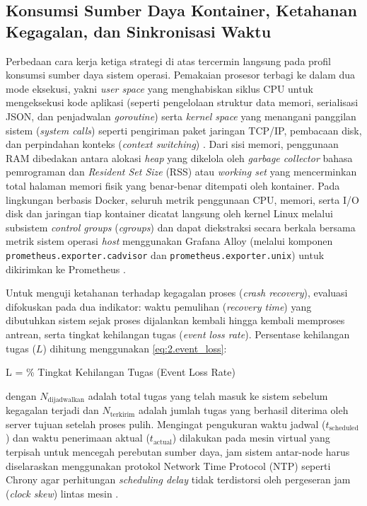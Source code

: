 \subsection{Konsumsi Sumber Daya Kontainer, Ketahanan Kegagalan, dan Sinkronisasi Waktu} \label{II.Teori_Resource}
Perbedaan cara kerja ketiga strategi di atas tercermin langsung pada profil konsumsi sumber daya sistem operasi. Pemakaian prosesor terbagi ke dalam dua mode eksekusi, yakni \textit{user space} yang menghabiskan siklus CPU untuk mengeksekusi kode aplikasi (seperti pengelolaan struktur data memori, serialisasi JSON, dan penjadwalan \textit{goroutine}) serta \textit{kernel space} yang menangani panggilan sistem (\textit{system calls}) seperti pengiriman paket jaringan TCP/IP, pembacaan disk, dan perpindahan konteks (\textit{context switching}) \cite{gregg2020systems}. Dari sisi memori, penggunaan RAM dibedakan antara alokasi \textit{heap} yang dikelola oleh \textit{garbage collector} bahasa pemrograman dan \textit{Resident Set Size} (RSS) atau \textit{working set} yang mencerminkan total halaman memori fisik yang benar-benar ditempati oleh kontainer. Pada lingkungan berbasis Docker, seluruh metrik penggunaan CPU, memori, serta I/O disk dan jaringan tiap kontainer dicatat langsung oleh kernel Linux melalui subsistem \textit{control groups} (\textit{cgroups}) dan dapat diekstraksi secara berkala bersama metrik sistem operasi \textit{host} menggunakan Grafana Alloy (melalui komponen \texttt{prometheus.exporter.cadvisor} dan \texttt{prometheus.exporter.unix}) untuk dikirimkan ke Prometheus \cite{gregg2020systems}. \par

Untuk menguji ketahanan terhadap kegagalan proses (\textit{crash recovery}), evaluasi difokuskan pada dua indikator: waktu pemulihan (\textit{recovery time}) yang dibutuhkan sistem sejak proses dijalankan kembali hingga kembali memproses antrean, serta tingkat kehilangan tugas (\textit{event loss rate}). Persentase kehilangan tugas ($L$) dihitung menggunakan \ref{eq:2.event_loss}: \par

\begin{equationcaptioned}{
    L =  \%
}{
    Tingkat Kehilangan Tugas (Event Loss Rate)
}
\end{equationcaptioned}

\noindent dengan $N_{\text{dijadwalkan}}$ adalah total tugas yang telah masuk ke sistem sebelum kegagalan terjadi dan $N_{\text{terkirim}}$ adalah jumlah tugas yang berhasil diterima oleh server tujuan setelah proses pulih. Mengingat pengukuran waktu jadwal ($t_{\text{scheduled}}$) dan waktu penerimaan aktual ($t_{\text{actual}}$) dilakukan pada mesin virtual yang terpisah untuk mencegah perebutan sumber daya, jam sistem antar-node harus diselaraskan menggunakan protokol Network Time Protocol (NTP) seperti Chrony agar perhitungan \textit{scheduling delay} tidak terdistorsi oleh pergeseran jam (\textit{clock skew}) lintas mesin \cite{kleppmann2026designing}. \par
